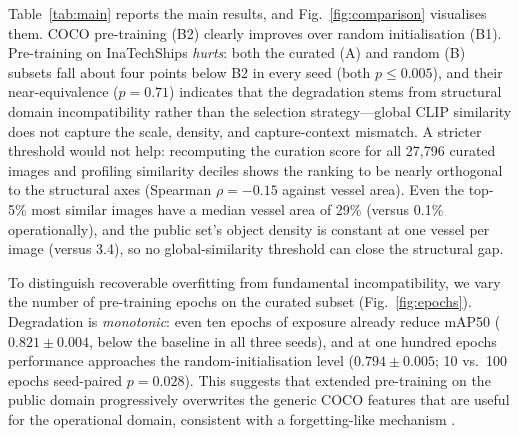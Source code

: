 \documentclass[10pt,conference]{IEEEtran}
\begin{document}
Table~\ref{tab:main} reports the main results, and Fig.~\ref{fig:comparison} visualises them. COCO pre-training (B2) clearly
improves over random initialisation (B1). Pre-training on InaTechShips
\emph{hurts}: both the curated (A) and random (B) subsets fall about four points
below B2 in every seed (both $p\le0.005$), and their near-equivalence ($p=0.71$) indicates
that the degradation stems from structural domain incompatibility rather than the
selection strategy---global CLIP similarity does not capture the scale, density,
and capture-context mismatch. A stricter threshold would not help: recomputing
the curation score for all 27{,}796 curated images and profiling similarity
deciles shows the ranking to be nearly orthogonal to the structural axes
(Spearman $\rho=-0.15$ against vessel area). Even the top-5\% most similar
images have a median vessel area of 29\% (versus 0.1\% operationally), and the
public set's object density is constant at one vessel per image (versus 3.4), so
no global-similarity threshold can close the structural gap.

To distinguish recoverable overfitting from fundamental incompatibility, we vary
the number of pre-training epochs on the curated subset (Fig.~\ref{fig:epochs}).
Degradation is \emph{monotonic}: even ten epochs of exposure already reduce mAP50
($0.821\pm0.004$, below the baseline in all three seeds), and at one hundred
epochs performance approaches the random-initialisation level ($0.794\pm0.005$;
10 vs.\ 100 epochs seed-paired $p=0.028$).
This suggests that extended pre-training on the public domain progressively
overwrites the generic COCO features that are useful for the operational domain,
consistent with a forgetting-like mechanism \cite{mccloskey1989catastrophic}.
\end{document}
